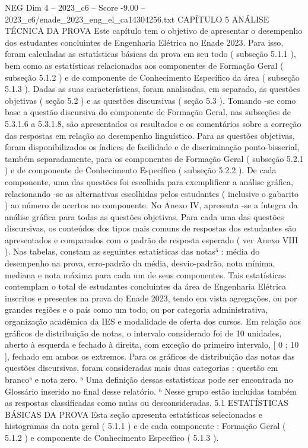 \begin{textsample}{NEG Dim 4 – 2023\_c6 – Score -9.00 – 2023\_c6/enade\_2023\_eng\_el\_ca14304256.txt}  \label{ex:f4_neg_005}
CAPÍTULO 5 ANÁLISE TÉCNICA DA PROVA Este capítulo tem o objetivo de apresentar o desempenho dos estudantes concluintes de Engenharia Elétrica no Enade 2023.
Para isso, foram calculadas as estatísticas básicas da prova em seu todo ( subseção 5.1.1 ), bem como as estatísticas relacionadas aos componentes de Formação Geral ( subseção 5.1.2 ) e de componente de Conhecimento Específico da área ( subseção 5.1.3 ).
Dadas as suas características, foram analisadas, em separado, as questões objetivas ( seção 5.2 ) e as questões discursivas ( seção 5.3 ).
Tomando -se como base a questão discursiva do componente de Formação Geral, nas subseções de 5.3.1.6 a 5.3.1.8, são apresentados os resultados e os comentários sobre a correção das respostas em relação ao desempenho linguístico.
Para as questões objetivas, foram disponibilizados os índices de facilidade e de discriminação ponto-bisserial, também separadamente, para os componentes de Formação Geral ( subseção 5.2.1 ) e de componente de Conhecimento Específico ( subseção 5.2.2 ).
De cada componente, uma das questões foi escolhida para exemplificar a análise gráfica, relacionando -se as alternativas escolhidas pelos estudantes ( inclusive o gabarito ) ao número de acertos no componente.
No Anexo IV, apresenta -se a íntegra da análise gráfica para todas as questões objetivas.
Para cada uma das questões discursivas, os conteúdos dos tipos mais comuns de respostas dos estudantes são apresentados e comparados com o padrão de resposta esperado ( ver Anexo VIII ).
Nas tabelas, constam as seguintes estatísticas das notas⁵ : média do desempenho na prova, erro-padrão da média, desvio-padrão, nota mínima, mediana e nota máxima para cada um de seus componentes.
Tais estatísticas contemplam o total de estudantes concluintes da área de Engenharia Elétrica inscritos e presentes na prova do Enade 2023, tendo em vista agregações, ou por grandes regiões e o país como um todo, ou por categoria administrativa, organização acadêmica da IES e modalidade de oferta dos cursos.
Em relação aos gráficos de distribuição de notas, o intervalo considerado foi de 10 unidades, aberto à esquerda e fechado à direita, com exceção do primeiro intervalo, [ 0 ; 10 ], fechado em ambos os extremos.
Para os gráficos de distribuição das notas das questões discursivas, foram consideradas mais duas categorias : questão em branco⁶ e nota zero. ⁵ Uma definição dessas estatísticas pode ser encontrada no Glossário inserido no final desse relatório. ⁶ Nesse grupo estão incluídas também as respostas classificadas como nulas ou desconsideradas. 5.1 ESTATÍSTICAS BÁSICAS DA PROVA Esta seção apresenta estatísticas selecionadas e histogramas da nota geral ( 5.1.1 ) e de cada componente : Formação Geral ( 5.1.2 ) e componente de Conhecimento Específico ( 5.1.3 ).

\end{textsample}

